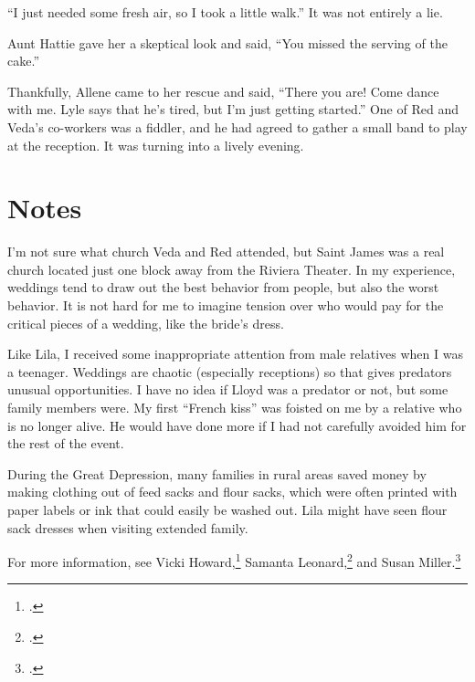 \documentclass[
  american,
  letterpaper,
]{book}
\begin{document}
``I just needed some fresh air, so I took a little walk.'' It was not
entirely a lie.

Aunt Hattie gave her a skeptical look and said, ``You missed the serving
of the cake.''

Thankfully, Allene came to her rescue and said, ``There you are! Come
dance with me. Lyle says that he's tired, but I'm just getting
started.'' One of Red and Veda's co-workers was a fiddler, and he had
agreed to gather a small band to play at the reception. It was turning
into a lively evening.

\section{Notes}\label{notes-23}

I'm not sure what church Veda and Red attended, but Saint James was a
real church located just one block away from the Riviera Theater. In my
experience, weddings tend to draw out the best behavior from people, but
also the worst behavior. It is not hard for me to imagine tension over
who would pay for the critical pieces of a wedding, like the bride's
dress.

Like Lila, I received some inappropriate attention from male relatives
when I was a teenager. Weddings are chaotic (especially receptions) so
that gives predators unusual opportunities. I have no idea if Lloyd was
a predator or not, but some family members were. My first ``French
kiss'' was foisted on me by a relative who is no longer alive. He would
have done more if I had not carefully avoided him for the rest of the
event.

During the Great Depression, many families in rural areas saved money by
making clothing out of feed sacks and flour sacks, which were often
printed with paper labels or ink that could easily be washed out. Lila
might have seen flour sack dresses when visiting extended family.

For more information, see Vicki Howard,\footnote{.} Samanta Leonard,\footnote{.} and Susan
Miller.\footnote{.}
\end{document}
